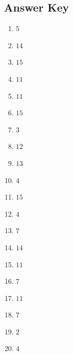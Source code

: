 \documentclass{article}
\begin{document}
\newpage

\subsection*{Answer Key}

\begin{enumerate}
\item $\displaystyle 5 $ \ 
\item $\displaystyle 14 $ \ 
\item $\displaystyle 15 $ \ 
\item $\displaystyle 11 $ \ 
\item $\displaystyle 11 $ \ 
\item $\displaystyle 15 $ \ 
\item $\displaystyle 3 $ \ 
\item $\displaystyle 12 $ \ 
\item $\displaystyle 13 $ \ 
\item $\displaystyle 4 $ \ 
\item $\displaystyle 15 $ \ 
\item $\displaystyle 4 $ \ 
\item $\displaystyle 7 $ \ 
\item $\displaystyle 14 $ \ 
\item $\displaystyle 11 $ \ 
\item $\displaystyle 7 $ \ 
\item $\displaystyle 11 $ \ 
\item $\displaystyle 7 $ \ 
\item $\displaystyle 2 $ \ 
\item $\displaystyle 4 $ \ 

\end{enumerate}
\end{document}
